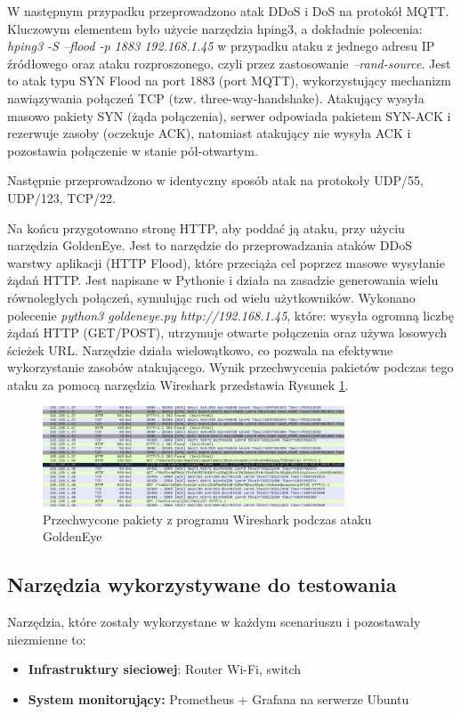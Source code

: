 W następnym przypadku przeprowadzono atak DDoS i DoS na protokół MQTT. Kluczowym elementem było użycie narzędzia hping3, a dokładnie polecenia: \textit{hping3 -S --flood -p 1883 192.168.1.45} w przypadku ataku z jednego adresu IP źródłowego oraz ataku rozproszonego, czyli przez zastosowanie \textit{--rand-source}. Jest to atak typu SYN Flood na port 1883 (port MQTT), wykorzystujący mechanizm nawiązywania połączeń TCP (tzw. three-way-handshake). Atakujący wysyła masowo pakiety SYN (żąda połączenia), serwer odpowiada pakietem SYN-ACK i rezerwuje zasoby (oczekuje ACK), natomiast atakujący nie wysyła ACK i pozostawia połączenie w stanie pół-otwartym.

Następnie przeprowadzono w identyczny sposób atak na protokoły UDP/55, UDP/123, TCP/22.

Na końcu przygotowano stronę HTTP, aby poddać ją ataku, przy użyciu narzędzia GoldenEye. Jest to narzędzie do przeprowadzania ataków DDoS warstwy aplikacji (HTTP Flood), które przeciąża cel poprzez masowe wysyłanie żądań HTTP. Jest napisane w Pythonie i działa na zasadzie generowania wielu równoległych połączeń, symulując ruch od wielu użytkowników. Wykonano polecenie \textit{python3 goldeneye.py http://192.168.1.45}, które: wysyła ogromną liczbę żądań HTTP (GET/POST), utrzymuje otwarte połączenia oraz używa losowych ścieżek URL. Narzędzie działa wielowątkowo, co pozwala na efektywne wykorzystanie zasobów atakującego. Wynik przechwycenia pakietów podczas tego ataku za pomocą narzędzia Wireshark przedstawia Rysunek \ref{fig:Przechwycone pakiety z programu Wireshark podczas ataku GoldenEye}.
\begin{figure}[h]
    \centering
    \includegraphics[width=0.8\textwidth]{pictures/wireshark-goldeneye.png}
    \caption{Przechwycone pakiety z programu Wireshark podczas ataku GoldenEye}
    \label{fig:Przechwycone pakiety z programu Wireshark podczas ataku GoldenEye}
\end{figure}

\subsection{Narzędzia wykorzystywane do testowania}
Narzędzia, które zostały wykorzystane w każdym scenariuszu i pozostawały niezmienne to:
\begin{itemize}
    \item \textbf{Infrastruktury sieciowej}: Router Wi-Fi, switch
    \item \textbf{System monitorujący:} Prometheus + Grafana na serwerze Ubuntu
\end{itemize}

